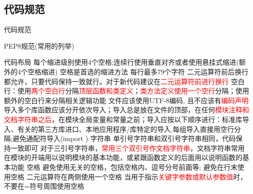\subsection{代码规范}
\begin{frame}[standout] 代码规范 \end{frame}
\begin{frame}[fragile]{PEP8规范(常用的列举)}
    \begin{myoutline}
        \1 代码布局
            \2 每个缩进级别使用4个空格;连续行使用垂直对齐或者使用悬挂式缩进(额外的4个空格缩进)
            \2 空格是首选的缩进方法
            \2 每行最多79个字符
            \2 二元运算符前后换行都允许，只要代码保持一致就行。对于新代码建议在\textcolor{red}{二元运算符前进行换行}
            \2 空白行：使用\textcolor{red}{两个空白行}分隔\textcolor{red}{顶层函数和类定义}；\textcolor{red}{类方法定义使用一个空行}分隔；使用额外的空白行来分隔相关逻辑功能
            \2 文件应该使用UTF-8编码, 且不应该有\textcolor{red}{编码声明}
            \2 导入多个库函数应该分开依次导入；导入总是放在文件的顶部，在任何\textcolor{red}{模块注释和文档字符串之后}，在模块全局变量和常量之前；导入应按以下顺序进行：标准库导入、有关的第三方库进口、本地应用程序/库特定的导入,每组导入直接用空行分隔;避免通配符导入(import \*)
        \1 字符串
            \2 单引号字符串和双引号字符串相同，代码保持一致即可
            \2 对于三引号字符串，\textcolor{red}{常用三个双引号作文档字符串}，文档字符串常用在模块的开端用以说明模块的基本功能，或紧跟函数定义的后面用以说明函数的基本功能
        \1 空格
            \2 避免使用无关的空格，包括空格内、逗号分号前面等; 避免在行末使用空格
            \2 二元运算符在两侧使用一个空格
            \2 当用于指示\textcolor{red}{关键字参数或默认参数值}时，不要在=符号周围使用空格
    \end{myoutline}
\end{frame}

